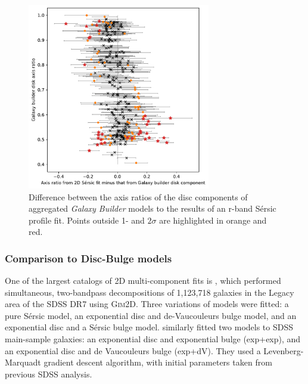 \documentclass[../main.tex]{subfiles}
\begin{document}
\begin{figure}
  \includegraphics[width=8cm]{images__results/gzb-agg-nsa-comparison.pdf}
  \caption{Difference between the axis ratios of the disc components of aggregated \textit{Galaxy Builder} models to the results of an r-band S\'ersic profile fit. Points outside 1- and $2\sigma$ are highlighted in orange and red.}
  \label{fig:ax_ratio_comparison}
\end{figure}


\subsubsection{Comparison to Disc-Bulge models}

One of the largest catalogs of 2D multi-component fits is \citet{2011ApJS..196...11S}, which performed simultaneous, two-bandpass decompositions of 1,123,718 galaxies in the Legacy area of the SDSS DR7 using \textsc{Gim2D}. Three variations of models were fitted: a pure S\'ersic model, an exponential disc and de-Vaucouleurs bulge model, and an exponential disc and a S\'ersic bulge model. \citet{2012MNRAS.421.2277L} similarly fitted two models to SDSS main-sample galaxies: an exponential disc and exponential bulge (exp+exp), and an exponential disc and de Vaucouleurs bulge (exp+dV). They used a Levenberg-Marquadt gradient descent algorithm, with initial parameters taken from previous SDSS analysis.
\end{document}
